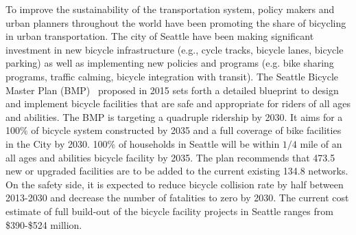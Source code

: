 \documentclass [11pt, proquest] {uwthesis}[2015/03/03]
\begin{document}
To improve the sustainability of the transportation system, policy makers and urban planners throughout the world have been promoting the share of bicycling in urban transportation. The city of Seattle have been making significant investment in new bicycle infrastructure (e.g., cycle tracks, bicycle lanes, bicycle parking) as well as implementing new policies and programs (e.g. bike sharing programs, traffic calming, bicycle integration with transit). The Seattle Bicycle Master Plan (BMP)~\cite{SDOT_BMP15} proposed in 2015 sets forth a detailed blueprint to design and implement bicycle facilities that are safe and appropriate for riders of all ages and abilities. The BMP is targeting a quadruple ridership by 2030. It aims for a 100\% of bicycle system constructed by 2035 and a full coverage of bike facilities in the City by 2030. 100\% of households in Seattle will be within $1/4$ mile of an all ages and abilities bicycle facility by 2035. The plan recommends that 473.5 new or upgraded facilities are to be added to the current existing 134.8 networks. On the safety side, it is expected to reduce bicycle collision rate by half between 2013-2030 and decrease the number of fatalities to zero by 2030. The current cost estimate of full build-out of the bicycle facility projects in Seattle ranges from \$390-\$524 million.
\end{document}
